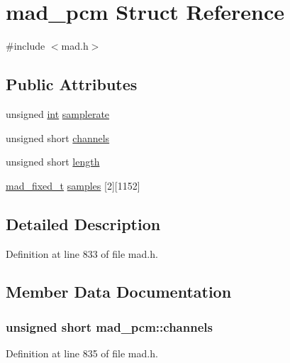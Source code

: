 \hypertarget{structmad__pcm}{}\section{mad\+\_\+pcm Struct Reference}
\label{structmad__pcm}


{\ttfamily \#include $<$mad.\+h$>$}

\subsection*{Public Attributes}
\begin{DoxyCompactItemize}
\item 
unsigned \hyperlink{xmltok_8h_a5a0d4a5641ce434f1d23533f2b2e6653}{int} \hyperlink{structmad__pcm_ace1a3d7e89cbd3176904c58e84cd7b2e}{samplerate}
\item 
unsigned short \hyperlink{structmad__pcm_aacd49045f4b8611f28022be2ce408952}{channels}
\item 
unsigned short \hyperlink{structmad__pcm_a95e3411a4d6ec7bf2b17ff7a783eb01e}{length}
\item 
\hyperlink{libmad_2fixed_8h_a8a4b50d6d4d6827b7a8c871db1cbfd78}{mad\+\_\+fixed\+\_\+t} \hyperlink{structmad__pcm_a855ec9f6dad7fad3a69d29abbe9a3ca3}{samples} \mbox{[}2\mbox{]}\mbox{[}1152\mbox{]}
\end{DoxyCompactItemize}


\subsection{Detailed Description}


Definition at line 833 of file mad.\+h.



\subsection{Member Data Documentation}
\subsubsection[{\texorpdfstring{channels}{channels}}]{\setlength{\rightskip}{0pt plus 5cm}unsigned short mad\+\_\+pcm\+::channels}\hypertarget{structmad__pcm_aacd49045f4b8611f28022be2ce408952}{}\label{structmad__pcm_aacd49045f4b8611f28022be2ce408952}


Definition at line 835 of file mad.\+h.

